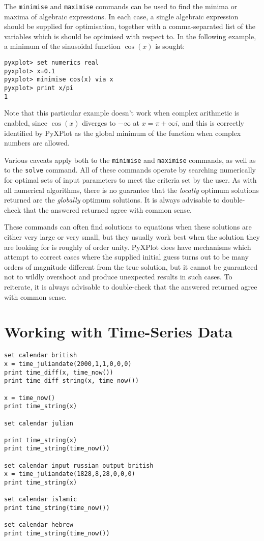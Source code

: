 The  {\tt minimise} and {\tt maximise}
commands can be used to find the minima or maxima of algebraic expressions. In
each case, a single algebraic expression should be supplied for optimisation,
together with a comma-separated list of the variables which is should be
optimised with respect to. In the following example, a minimum of the
sinusoidal function $\cos(x)$ is sought:

\begin{verbatim}
pyxplot> set numerics real
pyxplot> x=0.1
pyxplot> minimise cos(x) via x
pyxplot> print x/pi
1
\end{verbatim}

\noindent Note that this particular example doesn't work when complex
arithmetic is enabled, since $\cos(x)$ diverges to $-\infty$ at $x=\pi+\infty
i$, and this is correctly identified by PyXPlot as the global minimum of the
function when complex numbers are allowed.

Various caveats apply both to the {\tt minimise} and {\tt maximise} commands,
as well as to the {\tt solve} command.  All of these commands operate by
searching numerically for optimal sets of input parameters to meet the criteria
set by the user. As with all numerical algorithms, there is no guarantee that
the {\it locally} optimum solutions returned are the {\it globally} optimum
solutions. It is always advisable to double-check that the answered returned
agree with common sense.

These commands can often find solutions to equations when these solutions are
either very large or very small, but they usually work best when the solution
they are looking for is roughly of order unity.  PyXPlot does have mechanisms
which attempt to correct cases where the supplied initial guess turns out to be
many orders of magnitude different from the true solution, but it cannot be
guaranteed not to wildly overshoot and produce unexpected results in such
cases.  To reiterate, it is always advisable to double-check that the answered
returned agree with common sense.


\section{Working with Time-Series Data}
\label{sec:time_series}

\begin{verbatim}
set calendar british
x = time_juliandate(2000,1,1,0,0,0)
print time_diff(x, time_now())
print time_diff_string(x, time_now())

x = time_now()
print time_string(x)

set calendar julian

print time_string(x)
print time_string(time_now())

set calendar input russian output british
x = time_juliandate(1828,8,28,0,0,0)
print time_string(x)

set calendar islamic
print time_string(time_now())

set calendar hebrew
print time_string(time_now())
\end{verbatim}


